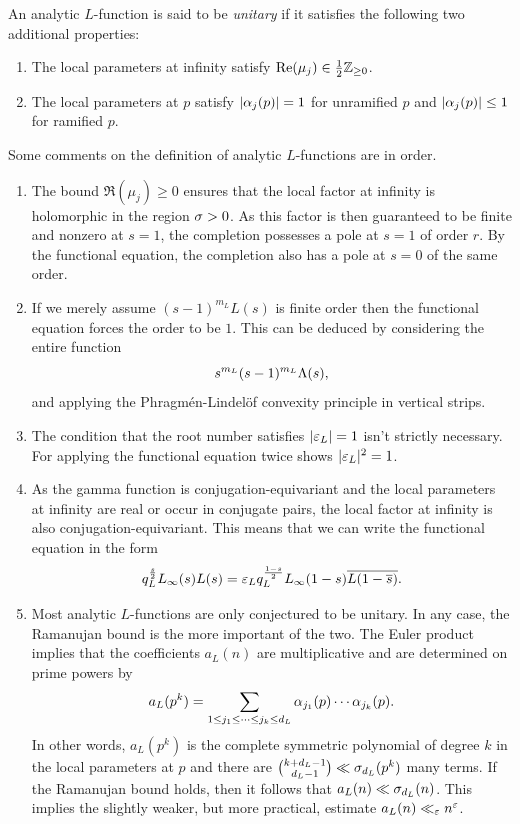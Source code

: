\documentclass[12pt]{article}
\begin{document}
    An analytic \(L\)-function is said to be \textit{unitary} if it satisfies the following two additional properties:

    \begin{enumerate}[align=left]
      \item[\textbf{Selberg bound:}] The local parameters at infinity satisfy \(\mathrm{Re}(\mu_{j}) \in \frac{1}{2}\mathbb{Z}_{\ge 0}\).
      \item[\textbf{Ramanujan bound:}] The local parameters at \(p\) satisfy \(|\alpha_{j}(p)| = 1\) for unramified \(p\) and \(|\alpha_{j}(p)| \le 1\) for ramified \(p\).
    \end{enumerate}

    Some comments on the definition of analytic \(L\)-functions are in order.
    \begin{enumerate}[label*=(\roman*)]
      \item The bound \(\Re(\mu_{j}) \ge 0\) ensures that the local factor at infinity is holomorphic in the region \(\sigma > 0\). As this factor is then guaranteed to be finite and nonzero at \(s = 1\), the completion possesses a pole at \(s = 1\) of order \(r\). By the functional equation, the completion also has a pole at \(s = 0\) of the same order.
      \item If we merely assume \((s-1)^{m_{L}}L(s)\) is finite order then the functional equation forces the order to be \(1\). This can be deduced by considering the entire function
    \[
      s^{m_{L}}(s-1)^{m_{L}}\Lambda(s),
    \]
    and applying the Phragm\'en-Lindel\"of convexity principle in vertical strips.
    \item The condition that the root number satisfies \(|\varepsilon_{L}| = 1\) isn't strictly necessary. For applying the functional equation twice shows \(|\varepsilon_{L}|^{2} = 1\).
    \item As the gamma function is conjugation-equivariant and the local parameters at infinity are real or occur in conjugate pairs, the local factor at infinity is also conjugation-equivariant. This means that we can write the functional equation in the form
    \[
      q_{L}^{\frac{s}{2}}L_{\infty}(s)L(s) = \varepsilon_{L}q_{L}^{\frac{1-s}{2}}L_{\infty}(1-s)\overline{L(1-\overline{s})}.
    \]
    \item Most analytic \(L\)-functions are only conjectured to be unitary. In any case, the Ramanujan bound is the more important of the two. The Euler product implies that the coefficients \(a_{L}(n)\) are multiplicative and are determined on prime powers by
    \[
      a_{L}(p^{k}) = \sum_{1 \le j_{1} \le \cdots \le j_{k} \le d_{L}}\alpha_{j_{1}}(p) \cdots \alpha_{j_{k}}(p).
    \]
    In other words, \(a_{L}(p^{k})\) is the complete symmetric polynomial of degree \(k\) in the local parameters at \(p\) and there are \(\binom{k+d_{L}-1}{d_{L}-1} \ll \sigma_{d_{L}}(p^{k})\) many terms. If the Ramanujan bound holds, then it follows that \(a_{L}(n) \ll \sigma_{d_{L}}(n)\). This implies the slightly weaker, but more practical, estimate \(a_{L}(n) \ll_{\varepsilon} n^{\varepsilon}\).
    \end{enumerate}
\end{document}
